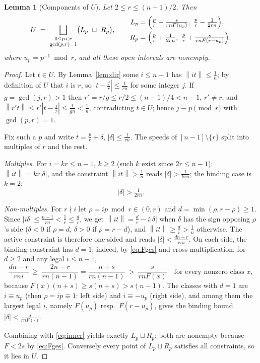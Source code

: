 \documentclass[11pt]{article}
\newtheorem{lemma}[theorem]{Lemma}
\theoremstyle{definition}
\newcommand{\norm}[1]{\left\lVert #1 \right\rVert}
\begin{document}
\begin{lemma}[Components of $U$]\label{lem:comp}
Let $2\le r\le (n-1)/2$. Then
\[
U\;=\;\bigsqcup_{\substack{0\le p<r\\ \gcd(p,r)=1}}
\bigl(L_p\ \sqcup\ R_p\bigr),\qquad
\begin{aligned}
L_p&=\Bigl(\tfrac pr-\tfrac{s}{rnF(u_p)},\ \tfrac pr-\tfrac1{2rn}\Bigr),\\
R_p&=\Bigl(\tfrac pr+\tfrac1{2rn},\ \tfrac pr+\tfrac{s}{rnF(r-u_p)}\Bigr),
\end{aligned}
\]
where $u_p=p^{-1}\bmod r$, and all these open intervals are nonempty.
\end{lemma}

\begin{proof}
Let $t\in U$. By Lemma~\ref{lem:dir} some $i\le n-1$ has
$\norm{it}\le\frac1n$; by definition of $U$ that $i$ is $r$, so
$|t-\frac jr|\le\frac1{rn}$ for some integer $j$. If $g=\gcd(j,r)>1$ then
$r'=r/g\le r/2\le(n-1)/4<n-1$, $r'\ne r$, and
$\norm{r't}\le r'|t-\tfrac jr|\le\frac1{gn}<\frac1n$, contradicting $t\in U$;
hence $j\equiv p\pmod r$ with $\gcd(p,r)=1$.

Fix such a $p$ and write $t=\frac pr+\delta$, $|\delta|\le\frac1{rn}$. The
speeds of $[n-1]\setminus\{r\}$ split into multiples of $r$ and the rest.

\emph{Multiples.} For $i=kr\le n-1$, $k\ge2$ (such $k$ exist since
$2r\le n-1$): $\norm{it}=kr|\delta|$, and the constraint
$\norm{it}>\frac1n$ reads $|\delta|>\frac1{krn}$; the binding case is $k=2$:
\begin{equation}\label{eq:inner}
|\delta|>\tfrac1{2rn}.
\end{equation}

\emph{Non-multiples.} For $r\nmid i$ let $\rho=ip\bmod r\in(0,r)$ and
$d=\min(\rho,r-\rho)\ge1$. Since $|i\delta|\le\frac{n-1}{rn}<\frac1r\le
\frac dr$, we get $\norm{it}=\frac dr-i|\delta|$ when $\delta$ has the sign
opposing $\rho$'s side ($\delta<0$ if $\rho=d$, $\delta>0$ if $\rho=r-d$),
and $\norm{it}\ge\frac dr>\frac1n$ otherwise. The active constraint is
therefore one-sided and reads $|\delta|<\frac{dn-r}{rni}$. On each side, the
binding constraint has $d=1$: indeed, by \eqref{eq:Fges} and
cross-multiplication, for $d\ge2$ and any legal $i\le n-1$,
\[
\frac{dn-r}{rni}\ \ge\ \frac{2n-r}{rn(n-1)}=\frac{n+s}{rn(n-1)}
\ >\ \frac{s}{rnF(x)}
\quad\text{for every nonzero class }x,
\]
because $F(x)(n+s)\ge s(n+s)>s(n-1)$. The classes with $d=1$ are
$i\equiv u_p$ (then $\rho=ip\equiv1$: left side) and $i\equiv-u_p$ (right
side), and among them the largest legal $i$, namely $F(u_p)$ resp.\
$F(r-u_p)$, gives the binding bound $|\delta|<\frac{s}{rnF(\cdot)}$.

Combining with \eqref{eq:inner} yields exactly $L_p\sqcup R_p$; both are
nonempty because $F<2s$ by \eqref{eq:Fges}. Conversely every point of
$L_p\sqcup R_p$ satisfies all constraints, so it lies in $U$.
\end{proof}
\end{document}
